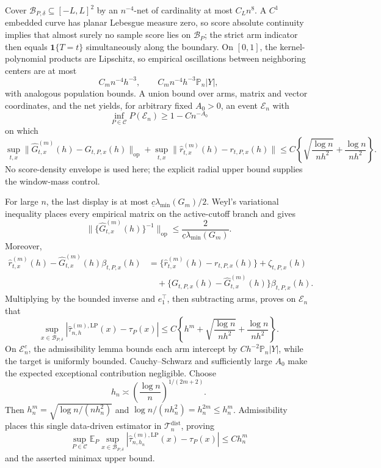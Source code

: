 Cover \(\mathcal B_{P,\delta}\subseteq[-L,L]^2\) by an \(n^{-4}\)-net of cardinality at most \(C_Ln^8\).  A \(C^1\) embedded curve has planar Lebesgue measure zero, so score absolute continuity implies that almost surely no sample score lies on \(\mathcal B_P\); the strict arm indicator then equals \(\mathbf1\{T=t\}\) simultaneously along the boundary.  On \([0,1]\), the kernel-polynomial products are Lipschitz, so empirical oscillations between neighboring centers are at most
\[
 C_mn^{-4}h^{-3},
 \qquad C_mn^{-4}h^{-3}\mathbb P_n|Y|,
\]
with analogous population bounds.  A union bound over arms, matrix and vector coordinates, and the net yields, for arbitrary fixed \(A_0>0\), an event \(\mathcal E_n\) with
\[
 \inf_{P\in\mathcal C}P(\mathcal E_n)\geq1-Cn^{-A_0}
\]
on which
\[
 \sup_{t,x}\|\widehat G^{(m)}_{t,x}(h)-G_{t,P,x}(h)\|_{\mathrm{op}}
 +\sup_{t,x}\|\widehat r^{(m)}_{t,x}(h)-r_{t,P,x}(h)\|
 \leq C\left\{\sqrt{\frac{\log n}{nh^2}}+\frac{\log n}{nh^2}\right\}.
\]
No score-density envelope is used here; the explicit radial upper bound supplies the window-mass control.

For large \(n\), the last display is at most \(\underline c\lambda_{\min}(G_m)/2\).  Weyl's variational inequality places every empirical matrix on the active-cutoff branch and gives
\[
 \|\{\widehat G^{(m)}_{t,x}(h)\}^{-1}\|_{\mathrm{op}}
 \leq\frac{2}{\underline c\lambda_{\min}(G_m)}.
\]
Moreover,
\[
\begin{aligned}
 \widehat r^{(m)}_{t,x}(h)-\widehat G^{(m)}_{t,x}(h)\beta_{t,P,x}(h)
 &=\{\widehat r^{(m)}_{t,x}(h)-r_{t,P,x}(h)\}+\zeta_{t,P,x}(h)\\
 &\quad+\{G_{t,P,x}(h)-\widehat G^{(m)}_{t,x}(h)\}\beta_{t,P,x}(h).
\end{aligned}
\]
Multiplying by the bounded inverse and \(e_1^\top\), then subtracting arms, proves on \(\mathcal E_n\) that
\[
 \sup_{x\in\mathcal B_{P,\delta}}
 |\widehat\tau^{(m),\mathrm{LP}}_{n,h}(x)-\tau_P(x)|
 \leq C\left\{h^m+\sqrt{\frac{\log n}{nh^2}}+
 \frac{\log n}{nh^2}\right\}.
\]
On \(\mathcal E_n^c\), the admissibility lemma bounds each arm intercept by \(Ch^{-2}\mathbb P_n|Y|\), while the target is uniformly bounded.  Cauchy--Schwarz and sufficiently large \(A_0\) make the expected exceptional contribution negligible.  Choose
\[
 h_n\asymp\left(\frac{\log n}{n}\right)^{1/(2m+2)}.
\]
Then \(h_n^m=\sqrt{\log n/(nh_n^2)}\) and \(\log n/(nh_n^2)=h_n^{2m}\leq h_n^m\).  Admissibility places this single data-driven estimator in \(\mathcal T_n^{\mathrm{dist}}\), proving
\[
 \sup_{P\in\mathcal C}\mathbb E_P\sup_{x\in\mathcal B_{P,\delta}}
 |\widehat\tau^{(m),\mathrm{LP}}_{n,h_n}(x)-\tau_P(x)|
 \leq Ch_n^m
\]
and the asserted minimax upper bound.

